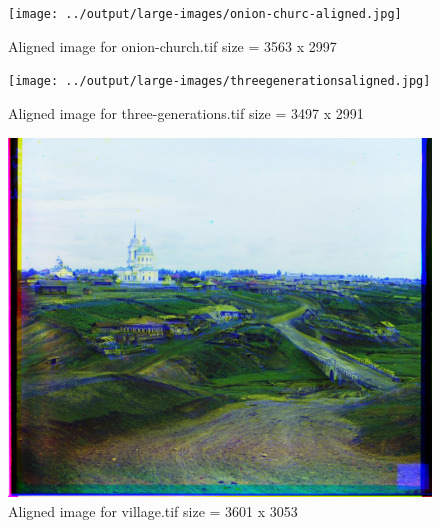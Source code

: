 \documentclass[10pt,letterpaper]{article}
\begin{document}
\begin{figure}
\centering
\texttt{[image: ../output/large-images/onion-churc-aligned.jpg]}
\caption{Aligned image for onion-church.tif  size = 3563 x 2997}
\end{figure}


\begin{figure}
\centering
\texttt{[image: ../output/large-images/threegenerationsaligned.jpg]}
\caption{Aligned image for three-generations.tif  size = 3497 x 2991}
\end{figure}

\begin{figure}
\centering
\includegraphics[width=\textwidth,height=\textheight,keepaspectratio]{../output/large-images/villag-aligned.jpg}
\caption{Aligned image for village.tif  size = 3601 x 3053}
\end{figure}
\end{document}
